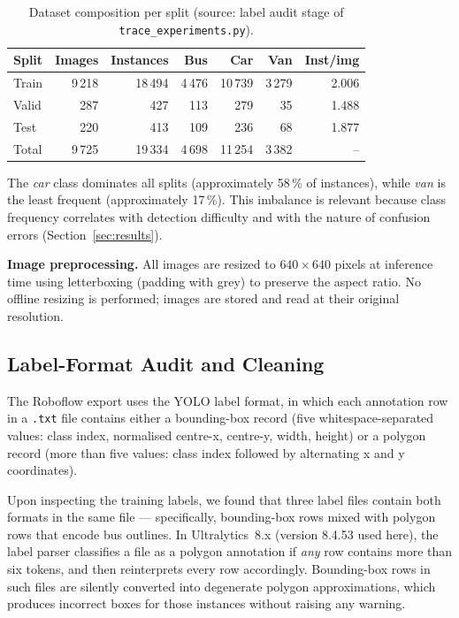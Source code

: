 \begin{table}[htbp]
\centering
\caption{Dataset composition per split (source: label audit stage of
\texttt{trace\_experiments.py}).}
\label{tab:dataset}
\begin{tabular}{lrrrrrr}
\toprule
Split & Images & Instances & Bus & Car & Van & Inst/img \\
\midrule
Train  & 9\,218 & 18\,494 & 4\,476 & 10\,739 & 3\,279 & 2.006 \\
Valid  &   287  &    427  &   113  &    279  &    35  & 1.488 \\
Test   &   220  &    413  &   109  &    236  &    68  & 1.877 \\
\midrule
Total  & 9\,725 & 19\,334 & 4\,698 & 11\,254 & 3\,382 & -- \\
\bottomrule
\end{tabular}
\end{table}

The \textit{car} class dominates all splits (approximately 58\,\% of
instances), while \textit{van} is the least frequent (approximately 17\,\%).
This imbalance is relevant because class frequency correlates with detection
difficulty and with the nature of confusion errors
(Section~\ref{sec:results}).

\textbf{Image preprocessing.}
All images are resized to $640\times640$ pixels at inference time using
letterboxing (padding with grey) to preserve the aspect ratio.
No offline resizing is performed; images are stored and read at their
original resolution.

\subsection{Label-Format Audit and Cleaning}
\label{sec:audit}

The Roboflow export uses the YOLO label format, in which each annotation
row in a \texttt{.txt} file contains either a bounding-box record
(five whitespace-separated values: class index, normalised centre-x,
centre-y, width, height) or a polygon record (more than five values:
class index followed by alternating x and y coordinates).

Upon inspecting the training labels, we found that three label files
contain both formats in the same file — specifically, bounding-box rows
mixed with polygon rows that encode bus outlines.
In Ultralytics~8.x (version 8.4.53 used here), the label parser
classifies a file as a polygon annotation if \emph{any} row contains more
than six tokens, and then reinterprets every row accordingly.
Bounding-box rows in such files are silently converted into degenerate
polygon approximations, which produces incorrect boxes for those
instances without raising any warning.

